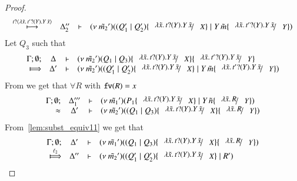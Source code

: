 \begin{proof}
\[\begin{array}{crll}
			\hby{\bactinp{t}{\abs{\tilde{x}}{\binp{t'}{Y} \appl{Y}{\tilde{x}}}}}
			& \Delta_2''& \proves& \newsp{\tilde{m_2}'}{(Q_1' \Par Q_2') \subst{\abs{\tilde{x}}{\binp{t}{Y} \appl{Y}{\tilde{x}}}}{X} \Par \appl{Y}{\tilde{m}} \subst{\abs{\tilde{x}}{\binp{t'}{Y} \appl{Y}{\tilde{x}}}}{Y}}
		\end{array}
	\]
%
%
	Let $Q_3$ such that
	\[
		\mhorel{\Gamma}{\Delta}{\newsp{\tilde{m_2}'}{Q_1 \Par Q_3} \subst{\abs{\tilde{x}}{\binp{t}{Y} \appl{Y}{\tilde{x}}}}{X} \subst{\abs{\tilde{x}}{\binp{t'}{Y} \appl{Y}{\tilde{x}}}}{Y}}
		{\Hby{}}
		{\Delta'}{}{\newsp{\tilde{m_2}'}{(Q_1' \Par Q_2') \subst{\abs{\tilde{x}}{\binp{t}{Y} \appl{Y}{\tilde{x}}}}{X} \Par \appl{Y}{\tilde{m}} \subst{\abs{\tilde{x}}{\binp{t'}{Y} \appl{Y}{\tilde{x}}}}{Y}}}
	\]
%
	\noi From  we get that $\forall R$ with $\mathtt{fv}(R) = x$
%
	\begin{eqnarray*}
		\mhorel{\Gamma}{\Delta_1'''}{\newsp{\tilde{m_1}'}{P_1 \subst{\abs{\tilde{x}}{\binp{t}{Y} \appl{Y}{\tilde{x}}}}{X} \Par \appl{Y}{\tilde{n}} \subst{\abs{\tilde{x}}{R}}{Y}}}
		{\wb}
		{\Delta'}{}{\newsp{\tilde{m_2}'}{(Q_1 \Par Q_3) \subst{\abs{\tilde{x}}{\binp{t}{Y} \appl{Y}{\tilde{x}}}}{X} \subst{\abs{\tilde{x}}{R}}{Y}}}
	\end{eqnarray*}
%
	\noi From~\ref{lem:subst_equiv11} we get that
\[
	\mhorel{\Gamma}{\Delta'}{\newsp{\tilde{m_1}'}{(Q_1 \Par Q_3) \subst{\abs{\tilde{x}}{\binp{t}{Y} \appl{Y}{\tilde{x}}}}{X} \subst{\abs{\tilde{x}}{R}}{Y}}}
	{\Hby{\ell_2}}
	{\Delta''}{}{\newsp{\tilde{m_2}'}{(Q_1' \Par Q_2') \subst{\abs{\tilde{x}}{\binp{t}{Y} \appl{Y}{\tilde{x}}}}{X} \Par R'}}%
\]
\end{proof}
